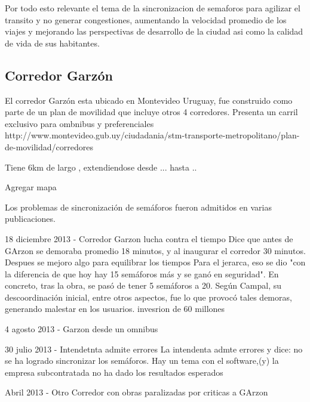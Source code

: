 Por todo esto relevante el tema de la sincronizacion de semaforos para agilizar el transito y no generar congestiones, aumentando la velocidad promedio de los viajes y mejorando las perspectivas de desarrollo de la ciudad asi como la calidad de vida de sus habitantes.

\subsection{Corredor Garzón}
El corredor Garzón esta ubicado en Montevideo Uruguay, fue construido como parte de un plan de movilidad que incluye otros 4 corredores. 
Presenta un carril exclusivo para ombnibus y preferenciales
http://www.montevideo.gub.uy/ciudadania/stm-transporte-metropolitano/plan-de-movilidad/corredores

Tiene 6km de largo , extendiendose desde ...  hasta ..

Agregar mapa

Los problemas de sincronización de semáforos fueron admitidos en varias publicaciones.

18 diciembre 2013 - Corredor Garzon lucha contra el tiempo %
Dice que antes de GArzon se demoraba promedio 18 minutos, y al inaugurar el corredor 30 minutos. Despues se mejoro algo para equilibrar los tiempos
Para el jerarca, eso se dio "con la diferencia de que hoy hay 15 semáforos más y se ganó en seguridad". En concreto, tras la obra, se pasó de tener 5 semáforos a 20. Según Campal, su descoordinación inicial, entre otros aspectos, fue lo que provocó tales demoras, generando malestar en los usuarios.
invesrion de 60 millones


4 agosto 2013 - Garzon desde un omnibus %


30 julio 2013  - Intendetnta admite errores %
La intendenta admte errores y dice: no se ha logrado sincronizar los semáforos. Hay un tema con el software,(y) la empresa subcontratada no ha dado los resultados esperados


Abril 2013 - Otro Corredor con obras paralizadas por criticas a GArzon





